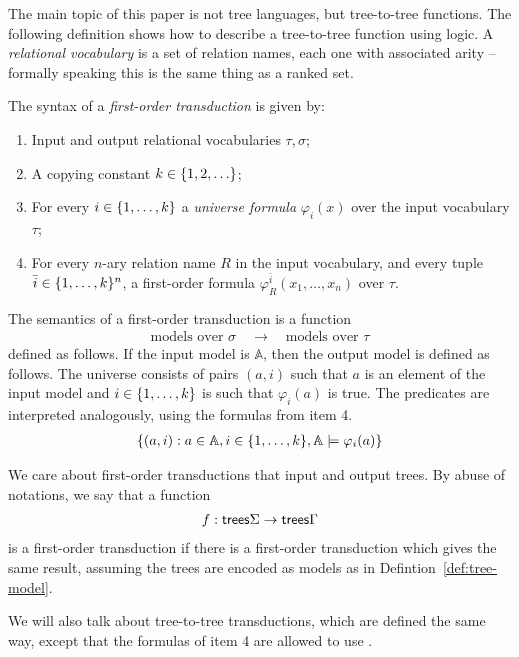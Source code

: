 The main topic of this paper is not tree languages, but tree-to-tree functions.
The following definition shows how to describe  a tree-to-tree function using logic. A \emph{relational vocabulary} is a set of relation names, each one with associated arity -- formally speaking this is the same thing as a ranked set. 

\begin{definition}\label{def:fo-transduction}
    The syntax of a \emph{first-order transduction}  is given by:
\begin{enumerate}
    \item Input and output relational vocabularies $\tau,\sigma$;
    \item A copying constant $k \in \{1,2,\ldots\}$;
    \item For every $i \in \{1,\ldots,k\}$ a \emph{universe formula} $\varphi_i(x)$ over the input vocabulary $\tau$;
    \item For every $n$-ary relation name $R$ in the input vocabulary, and every tuple $\bar i \in \{1,\ldots,k\}^n$, a first-order formula $\varphi_R^{\bar i}(x_1,\ldots,x_n)$ over $\tau$.
\end{enumerate}
\end{definition}

The semantics of a first-order transduction is  a function
\begin{align*}
    \text{models over $\sigma$} \quad \to \quad \text{models over $\tau$}
\end{align*}
defined as follows. If the input model is $\mathbb A$, then the output model is defined as follows. The universe consists of pairs $(a,i)$ such that $a$ is an element of the input model and $i \in \{1,\ldots,k\}$ is such that $\varphi_i(a)$ is true. The predicates are interpreted analogously, using the formulas from item 4. 
\begin{align*}
    \{(a,i) : a \in \mathbb A, i \in \{1,\ldots,k\} , \mathbb A \models \varphi_i(a)\}
\end{align*}

We care about first-order transductions that input and output trees. By abuse of notations, we say that a  function 
    \begin{align*}
        f : \mathsf {trees} \Sigma \to \mathsf {trees} \Gamma
    \end{align*}
    is  a first-order transduction if there is a first-order transduction which gives the same result, assuming the trees are encoded as models as in Defintion~\ref{def:tree-model}.   

    We will also talk about \mso tree-to-tree transductions, which are defined the same way, except that the formulas of item 4 are allowed to use \mso. 
